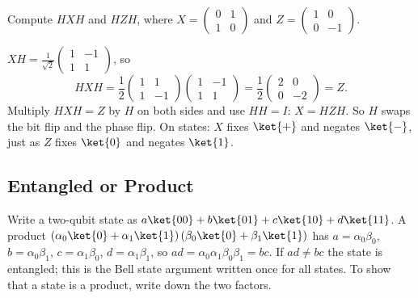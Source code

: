 \begin{exercisebox}
\begin{pproblem}[$HXH$]\label{wp:hxh}
    Compute $HXH$ and $HZH$, where $X = \begin{pmatrix} 0 & 1 \\ 1 & 0 \end{pmatrix}$ and
    $Z = \begin{pmatrix} 1 & 0 \\ 0 & -1 \end{pmatrix}$.
\end{pproblem}
\tcblower
\begin{wsolution}
    $XH = \frac{1}{\sqrt{2}} \begin{pmatrix} 1 & -1 \\ 1 & 1 \end{pmatrix}$, so
    \[HXH = \frac{1}{2} \begin{pmatrix} 1 & 1 \\ 1 & -1 \end{pmatrix} \begin{pmatrix} 1 & -1 \\ 1 & 1 \end{pmatrix}
        = \frac{1}{2} \begin{pmatrix} 2 & 0 \\ 0 & -2 \end{pmatrix} = Z.\]
    Multiply $HXH = Z$ by $H$ on both sides and use $HH = I$: $X = HZH$. So $H$ swaps the bit flip
    and the phase flip. On states: $X$ fixes $\ket{+}$ and negates $\ket{-}$, just as $Z$ fixes
    $\ket{0}$ and negates $\ket{1}$.
\end{wsolution}
\end{exercisebox}

\subsection{Entangled or Product}

Write a two-qubit state as $a\ket{00} + b\ket{01} + c\ket{10} + d\ket{11}$. A product
$\left(\alpha_0\ket{0} + \alpha_1\ket{1}\right)\left(\beta_0\ket{0} + \beta_1\ket{1}\right)$ has
$a = \alpha_0\beta_0$, $b = \alpha_0\beta_1$, $c = \alpha_1\beta_0$, $d = \alpha_1\beta_1$, so
$ad = \alpha_0\alpha_1\beta_0\beta_1 = bc$. If $ad \neq bc$ the state is entangled; this is the Bell
state argument written once for all states. To show that a state is a product, write down the two
factors.

